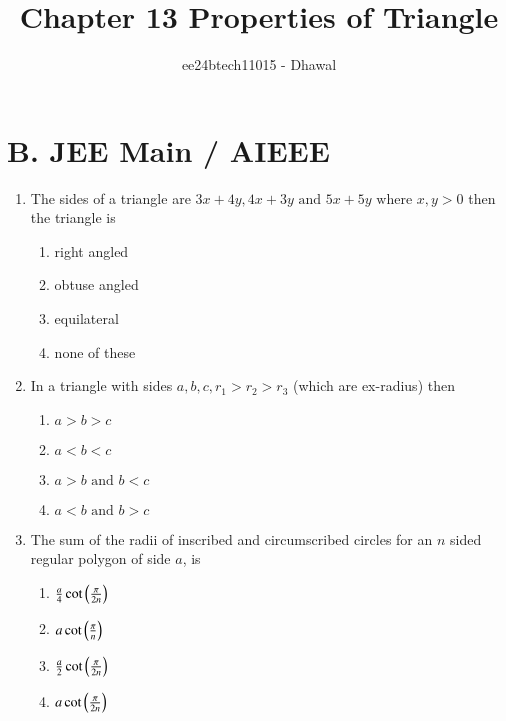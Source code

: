 \documentclass[journal]{IEEEtran}
\theoremstyle{remark}
\begin{document}

\onecolumn

\title{Chapter 13 Properties of Triangle}
\author{ee24btech11015 - Dhawal}
\maketitle

\renewcommand{\thefigure}{\theenumi}
\renewcommand{\thetable}{\theenumi}

\section*{B. JEE Main / AIEEE}
\begin{enumerate}
	\item The sides of a triangle are $3x+4y,4x+3y \text{ and } 5x+5y \text{ where } x,y>0$ then the triangle is \hfill{}

\begin{multicols}{4}
\begin{enumerate}
\item right angled
\item obtuse angled
\item equilateral
\item none of these
\end{enumerate}
\end{multicols}

    \item In a triangle with sides $a,b,c,r_1>r_2>r_3$ (which are ex-radius) then \hfill{}

\begin{multicols}{4}
\begin{enumerate}
\item $a>b>c$
\item $a<b<c$
\item $a>b \text{ and } b<c$
\item $a<b \text{ and } b>c$
\end{enumerate}
\end{multicols}
        
    \item The sum of the radii of inscribed and circumscribed circles for an $n$ sided regular polygon of side $a$, is \hfill{}
\begin{multicols}{4}
\begin{enumerate}
        \item $\frac{a}{4} \cot{\ensuremath{\left(\frac{\pi}{2n}\right)}}$         
        \item $ a \cot{\ensuremath{\left(\frac{\pi}{n}\right)}}$ 
        \item $\frac{a}{2} \cot{\ensuremath{\left(\frac{\pi}{2n}\right)}}$ 
        \item $ a \cot{\ensuremath{\left(\frac{\pi}{2n}\right)}}$
\end{enumerate}
\end{multicols}


\end{enumerate}
\end{document}
